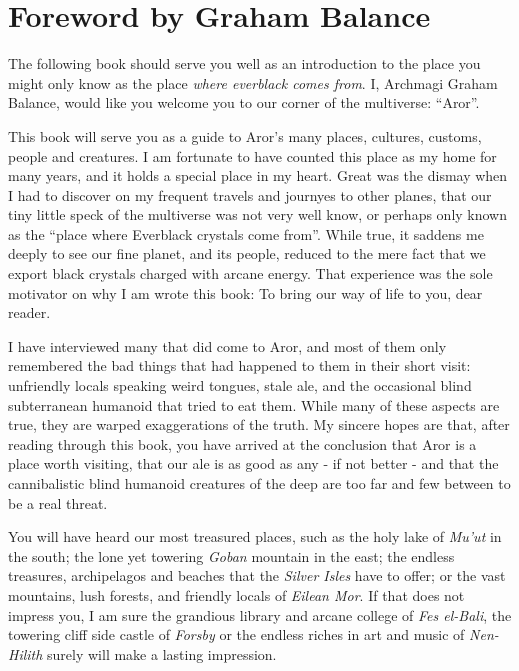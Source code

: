 \pagebreak

\onecolumn
\section{Foreword by Graham Balance}

The following book should serve you well as an introduction to the
place you might only know as the place \emph{where everblack comes
  from}. I, Archmagi Graham Balance, would like you welcome you to
our corner of the multiverse: ``Aror''.

This book will serve you as a guide to Aror's many places, cultures,
customs, people and creatures. I am fortunate to have counted this
place as my home for many years, and it holds a special place in my
heart. Great was the dismay when I had to discover on my frequent
travels and journyes to other planes, that our tiny little speck of
the multiverse was not very well know, or perhaps only known as the
``place where Everblack crystals come from''. While true, it saddens
me deeply to see our fine planet, and its people, reduced to the mere
fact that we export black crystals charged with arcane energy. That
experience was the sole motivator on why I am wrote this book: To bring
our way of life to you, dear reader.

I have interviewed many that did come to Aror, and most of them only
remembered the bad things that had happened to them in their short
visit: unfriendly locals speaking weird tongues, stale ale, and the
occasional blind subterranean humanoid that tried to eat them. While
many of these aspects are true, they are warped exaggerations of the
truth. My sincere hopes are that, after reading through this book, you
have arrived at the conclusion that Aror is a place worth visiting,
that our ale is as good as any - if not better - and that the
cannibalistic blind humanoid creatures of the deep are too far and few
between to be a real threat.

You will have heard our most treasured places, such as the holy lake
of \emph{Mu'ut} in the south; the lone yet towering \emph{Goban}
mountain in the east; the endless treasures, archipelagos and beaches
that the \emph{Silver Isles} have to offer; or the vast mountains,
lush forests, and friendly locals of \emph{Eilean Mor}. If that does
not impress you, I am sure the grandious library and arcane college of
\emph{Fes el-Bali}, the towering cliff side castle of \emph{Forsby} or
the endless riches in art and music of \emph{Nen-Hilith} surely will
make a lasting impression.

